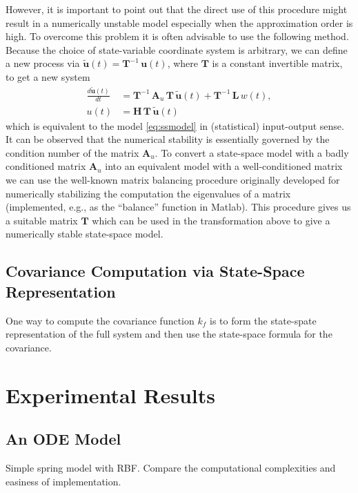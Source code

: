 \documentclass[journal]{IEEEtran}
\newcommand{\simo}[1]{{\color{red}#1}}
\begin{document}
However, it is important to point out that the direct use of this procedure might result in a numerically unstable model especially when the approximation order is high. To overcome this problem it is often advisable to use the following method. 
Because the choice of state-variable coordinate system is arbitrary, we can define a new process via $\tilde{\mathbf{u}}(t) = \mathbf{T}^{-1} \, \mathbf{u}(t)$, where $\mathbf{T}$ is a constant invertible matrix, to get a new system
%
\begin{equation}
\begin{split}
    \frac{d\tilde{\mathbf{u}}(t)}{dt}
    &= \mathbf{T}^{-1} \, \mathbf{A}_u \, \mathbf{T} \, \tilde{\mathbf{u}}(t)
    + \mathbf{T}^{-1} \, \mathbf{L} \, w(t), \\
   u(t) &= \mathbf{H} \, \mathbf{T} \, \tilde{\mathbf{u}}(t)
\end{split}
\end{equation}
%
which is equivalent to the model \eqref{eq:ssmodel} in (statistical) input-output sense. It can be observed that the numerical stability is essentially governed by the condition number of the matrix $\mathbf{A}_u$. To convert a state-space model with a badly conditioned matrix $\mathbf{A}_u$ into an equivalent model with a well-conditioned matrix we can use the well-known matrix balancing procedure
\cite{Parlett+Reinsch:1971}
originally developed for numerically stabilizing the computation the eigenvalues of a matrix (implemented, e.g., as the ``balance'' function in Matlab). This procedure gives us a suitable matrix $\mathbf{T}$ which can be used in the transformation above to give a numerically stable state-space model.


\subsection{Covariance Computation via State-Space Representation}
%
\simo{One way to compute the covariance function $k_f$ is to form the state-spate representation of the full system and then use the state-space formula for the covariance.}


\section{Experimental Results}

\subsection{An ODE Model}
%
\simo{Simple spring model with RBF. Compare the computational complexities and easiness of implementation.}
\end{document}
